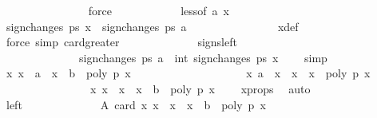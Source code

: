 \begin{isabellebody}
\ \ \ \ \ \ \ \ \ \ \ \ \ \ \isamarkupfalse%
\ force\isanewline
\ \ \ \ \ \ \ \ \ \ \isamarkupfalse%
\ less{\isacharparenleft}{}{\isacharparenright}{\isacharbrackleft}of\ a\ x{\isacharprime}{\isacharbrackright}\ \isamarkupfalse%
\ {\isachardoublequoteopen}sign{\isacharunderscore}changes\ ps\ x{\isacharprime}\ {\isacharequal}\ sign{\isacharunderscore}changes\ ps\ a{\isachardoublequoteclose}\isanewline
\ \ \ \ \ \ \ \ \ \ \ \ \ \ \isamarkupfalse%
\ x{\isacharprime}{\isacharunderscore}def\ {\isacharbackquoteopen}{\isasymepsilon}\ {\isachargreater}\ {}{\isacharbackquoteclose}\ \isamarkupfalse%
\ {\isacharparenleft}force\ simp{\isacharcolon}\ card{\isacharunderscore}greater{\isacharunderscore}{}{\isacharparenright}\isanewline
\isanewline
\ \ \ \ \ \ \ \ \ \ \isamarkupfalse%
\ \isamarkupfalse%
\ signs{\isacharunderscore}left{\isacharcolon}\ \isanewline
\ \ \ \ \ \ \ \ \ \ \ \ \ \ {\isachardoublequoteopen}sign{\isacharunderscore}changes\ ps\ a\ {\isacharminus}\ int\ {\isacharparenleft}sign{\isacharunderscore}changes\ ps\ x{\isacharparenright}\ {\isacharequal}\ {}{\isachardoublequoteclose}\ \isamarkupfalse%
\ simp\isanewline
\isanewline
\ \ \ \ \ \ \ \ \ \ \isamarkupfalse%
\ {\isachardoublequoteopen}{\isacharbraceleft}x{\isachardot}\ x\ {\isachargreater}\ a\ {\isasymand}\ x\ {\isasymle}\ b\ {\isasymand}\ poly\ p\ x\ {\isacharequal}\ {}{\isacharbraceright}\ {\isacharequal}\ \isanewline
\ \ \ \ \ \ \ \ \ \ \ \ \ \ \ \ {\isacharbraceleft}x{\isacharprime}{\isachardot}\ a\ {\isacharless}\ x{\isacharprime}\ {\isasymand}\ x{\isacharprime}\ {\isasymle}\ x\ {\isasymand}\ poly\ p\ x{\isacharprime}\ {\isacharequal}\ {}{\isacharbraceright}\ {\isasymunion}\isanewline
\ \ \ \ \ \ \ \ \ \ \ \ \ \ \ \ {\isacharbraceleft}x{\isacharprime}{\isachardot}\ x\ {\isacharless}\ x{\isacharprime}\ {\isasymand}\ x{\isacharprime}\ {\isasymle}\ b\ {\isasymand}\ poly\ p\ x{\isacharprime}\ {\isacharequal}\ {}{\isacharbraceright}{\isachardoublequoteclose}\ \isamarkupfalse%
\ x{\isacharunderscore}props\ \isamarkupfalse%
\ auto\isanewline
\ \ \ \ \ \ \ \ \ \ \isamarkupfalse%
\ \isamarkupfalse%
\ left\isanewline
\ \ \ \ \ \ \ \ \ \ \isamarkupfalse%
\ \isamarkupfalse%
\ A{\isacharcolon}\ {\isachardoublequoteopen}card\ {\isacharbraceleft}x{\isacharprime}{\isachardot}\ x\ {\isacharless}\ x{\isacharprime}\ {\isasymand}\ x{\isacharprime}\ {\isasymle}\ b\ {\isasymand}\ poly\ p\ x{\isacharprime}\ {\isacharequal}\ {}{\isacharbraceright}\ {\isacharplus}\ {}\ {\isacharequal}\ \isanewline

\end{isabellebody}

